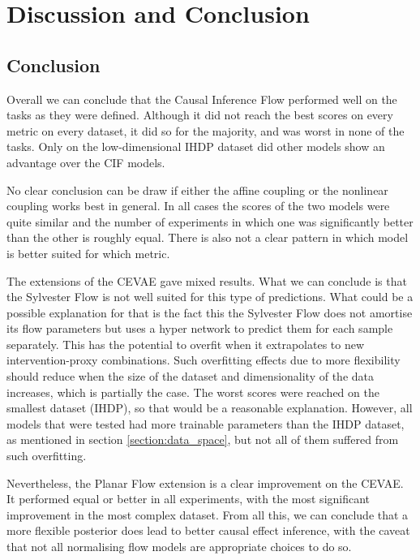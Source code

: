\documentclass{report}
\begin{document}
\chapter{Discussion and Conclusion}

\section{Conclusion}
Overall we can conclude that the Causal Inference Flow performed well on the tasks as they were defined. Although it did not reach the best scores on every metric on every dataset, it did so for the majority, and was worst in none of the tasks. Only on the low-dimensional IHDP dataset did other models show an advantage over the CIF models.

No clear conclusion can be draw if either the affine coupling or the nonlinear coupling works best in general. In all cases the scores of the two models were quite similar and the number of experiments in which one was significantly better than the other is roughly equal. There is also not a clear pattern in which model is better suited for which metric. 

The extensions of the CEVAE gave mixed results. What we can conclude is that the Sylvester Flow is not well suited for this type of predictions. What could be a possible explanation for that is the fact this the Sylvester Flow does not amortise its flow parameters but uses a hyper network to predict them for each sample separately. This has the potential to overfit when it extrapolates to new intervention-proxy combinations. Such overfitting effects due to more flexibility should reduce when the size of the dataset and dimensionality of the data increases, which is partially the case. The worst scores were reached on the smallest dataset (IHDP), so that would be a reasonable explanation. However, all models that were tested had more trainable parameters than the IHDP dataset, as mentioned in section \ref{section:data_space}, but not all of them suffered from such overfitting.

Nevertheless, the Planar Flow extension is a clear improvement on the CEVAE. It performed equal or better in all experiments, with the most significant improvement in the most complex dataset. From all this, we can conclude that a more flexible posterior does lead to better causal effect inference, with the caveat that not all normalising flow models are appropriate choices to do so.
\end{document}

